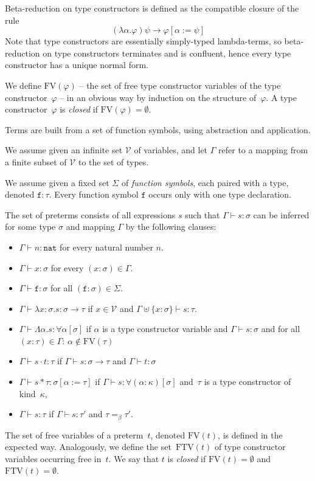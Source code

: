 \documentclass[runningheads,a4paper]{llncs}
\newcommand{\Vars}{\mathcal{V}}
\newcommand{\quant}[2]{\forall #1[#2]}
\newcommand{\arrtype}{\rightarrow}
\newcommand{\abs}[2]{\lambda #1.#2}
\newcommand{\tabs}[2]{\Lambda #1.#2}
\newcommand{\app}[2]{#1 \cdot #2}
\newcommand{\tapp}[2]{#1 * #2}
\newcommand{\subst}[2]{#1:=#2}
\newcommand{\FTV}{\mathrm{FTV}}
\newcommand{\FV}{\mathrm{FV}}
\newcommand{\nat}{\mathtt{nat}}
\begin{document}
\begin{definition}
  Beta-reduction on type constructors is defined as the compatible
  closure of the rule
  \[
  (\lambda\alpha.\varphi)\psi \to \varphi[\alpha := \psi]
  \]
  Note that type constructors are essentially simply-typed
  lambda-terms, so beta-reduction on type constructors terminates and
  is confluent, hence every type constructor has a unique normal form.

  We define $\FV(\varphi)$ -- the set of free type constructor
  variables of the type constructor~$\varphi$ -- in an obvious way by
  induction on the structure of~$\varphi$. A type
  constructor~$\varphi$ is \emph{closed} if
  $\FV(\varphi) = \emptyset$.
\end{definition}

Terms are built from a set of function symbols, using abstraction and
application.

\begin{definition}\label{def_preterms}\normalfont
  We assume given an infinite set $\Vars$ of variables, and let
  $\Gamma$ refer to a mapping from a finite subset of $\Vars$ to the
  set of types.

  We assume given a fixed set $\Sigma$ of \emph{function symbols},
  each paired with a type, denoted $\mathtt{f} : \tau$.  Every
  function symbol $\mathtt{f}$ occurs only with one type declaration.

  The set of preterms consists of all expressions $s$ such that
  $\Gamma \vdash s : \sigma$ can be inferred for some type $\sigma$
  and mapping $\Gamma$ by the following clauses:
  \begin{itemize}
  \item $\Gamma \vdash n : \nat$ for every natural number $n$.
  \item $\Gamma \vdash x : \sigma$ for every $(x : \sigma) \in \Gamma$.
  \item $\Gamma \vdash \mathtt{f} : \sigma$ for all
    $(\mathtt{f} : \sigma) \in \Sigma$.
  \item $\Gamma \vdash \abs{x:\sigma}{s} : \sigma \arrtype \tau$ if $x
    \in \Vars$ and $\Gamma \uplus \{ x : \sigma \} \vdash s : \tau$.
  \item $\Gamma \vdash \tabs{\alpha}{s} : \quant{\alpha}{\sigma}$ if
    $\alpha$ is a type constructor variable and $\Gamma \vdash s :
    \sigma$ and for all $(x : \tau) \in \Gamma$: $\alpha \notin
    \FV(\tau)$
  \item $\Gamma \vdash \app{s}{t} : \tau$ if $\Gamma \vdash s : \sigma
    \arrtype \tau$ and $\Gamma \vdash t : \sigma$
  \item $\Gamma \vdash \tapp{s}{\tau} : \sigma[\subst{\alpha}{\tau}]$ if
    $\Gamma \vdash s : \quant{(\alpha:\kappa)}{\sigma}$ and~$\tau$ is a
    type constructor of kind~$\kappa$,
  \item $\Gamma \vdash s : \tau$ if $\Gamma \vdash s : \tau'$ and $\tau
    =_\beta \tau'$.
  \end{itemize}
  The set of free variables of a preterm~$t$, denoted $\FV(t)$, is
  defined in the expected way. Analogously, we define the set~$\FTV(t)$
  of type constructor variables occurring free in~$t$. We say that $t$
  is \emph{closed} if $\FV(t) = \emptyset$ and $\FTV(t) = \emptyset$.
\end{definition}
\end{document}
